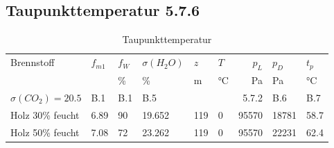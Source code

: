 \documentclass[a4paper,10pt,twoside]{article}
\begin{document}
\subsection{Taupunkttemperatur 5.7.6}
\label{sec:orgfccb719}
\begin{table}[htbp]
\caption{Taupunkttemperatur}
\centering
\begin{tabular}{llllllrll}
Brennstoff & \(f_{m1}\) & \(f_W\) & \(\sigma(H_2O)\) & \(z\) & \(T\) & \(p_L\) & \(p_D\) & \(t_p\)\\
 &  & \% & \% & m & °C & Pa & Pa & °C\\
\(\sigma(CO_2)=20.5\) & B.1 & B.1 & B.5 &  &  & 5.7.2 & B.6 & B.7\\
\hline
Holz 30\% feucht & 6.89 & 90 & 19.652 & 119 & 0 & 95570 & 18781 & 58.7\\
Holz 50\% feucht & 7.08 & 72 & 23.262 & 119 & 0 & 95570 & 22231 & 62.4\\
\end{tabular}
\end{table}
\end{document}
